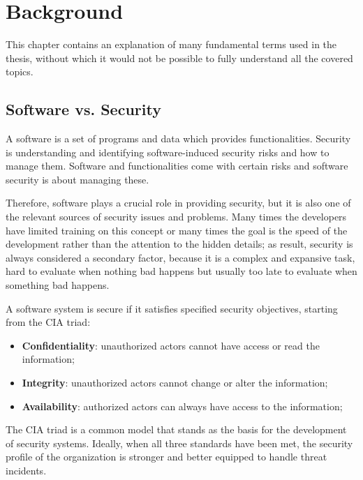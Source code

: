 \chapter{Background}
\label{cha:background}


This chapter contains an explanation of many fundamental terms used in the thesis, without which it would not be possible to fully understand all the covered topics.

\section{Software vs. Security}

A software is a set of programs and data which provides functionalities. Security is understanding and identifying software-induced security risks and how to manage them. Software and functionalities come with certain risks and software security is about managing these.

Therefore, software plays a crucial role in providing security, but it is also one of the relevant sources of security issues and problems. Many times the developers have limited training on this concept or many times the goal is the speed of the development rather than the attention to the hidden details; as result, security is always considered a secondary factor, because it is a complex and expansive task, hard to evaluate when nothing bad happens but usually too late to evaluate when something bad happens.~\cite{marchetto-st-slides}

A software system is secure if it satisfies specified security objectives, starting from the CIA triad:
\begin{itemize}
  \item \textbf{Confidentiality}: unauthorized actors cannot have access or read the information;
  \item \textbf{Integrity}: unauthorized actors cannot change or alter the information;
  \item \textbf{Availability}: authorized actors can always have access to the information;
\end{itemize}
The CIA triad is a common model that stands as the basis for the development of security systems. Ideally, when all three standards have been met, the security profile of the organization is stronger and better equipped to handle threat incidents.~\cite{cia-triad}

